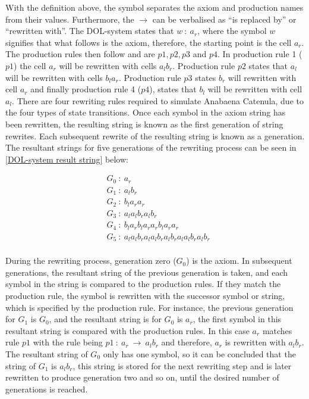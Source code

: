 \noindent
With the definition above, the \say{:} symbol separates the axiom and production names from their values. Furthermore, the $\rightarrow$ can be verbalised as ``is replaced by'' or ``rewritten with''. The DOL-system states that $w~ :~ a_r$, where the symbol $w$ signifies that what follows is the axiom, therefore, the starting point is the cell $a_r$. The production rules then follow and are $p1, p2, p3$ and $p4$. In production rule 1 ($p1$) the cell $a_r$ will be rewritten with cells $a_l b_r$. Production rule $p2$ states that $a_l$ will be rewritten with cells $b_l a_r$. Production rule $p3$ states $b_r$ will rewritten with cell $a_r$ and finally production rule 4 ($p4$), states that $b_l$ will be rewritten with cell $a_l$. There are four rewriting rules required to simulate Anabaena Catenula, due to the four types of state transitions. Once each symbol in the axiom string has been rewritten, the resulting string is known as the first generation of string rewrites. Each subsequent rewrite of the resulting string is known as a generation. The resultant strings for five generations of the rewriting process can be seen in \ref{DOL-system result string} below:

\begin{equation} \label{DOL-system result string}
\begin{aligned}
	& G_0~ :~ a_r \\
	& G_1~ :~ a_l b_r \\
	& G_2~ :~ b_l a_r a_r \\
	& G_3~ :~ a_l a_l b_r a_l b_r \\
	& G_4~ :~ b_l a_r b_l a_r a_r b_l a_r a_r \\
	& G_5~ :~ a_l a_l b_r a_l a_l b_r a_l b_r a_l a_l b_r a_l b_r \\
\end{aligned}
\end{equation}

\noindent
During the rewriting process, generation zero ($G_0$) is the axiom. In subsequent generations, the resultant string of the previous generation is taken, and each symbol in the string is compared to the production rules. If they match the production rule, the symbol is rewritten with the successor symbol or string, which is specified by the production rule. For instance, the previous generation for $G_1$ is $G_0$, and the resultant string is for $G_0$ is $a_r$, the first symbol in this resultant string is compared with the production rules. In this case $a_r$ matches rule $p1$ with the rule being $p1~ :~ a_r~ \rightarrow~ a_l b_r$ and therefore, $a_r$ is rewritten with $a_l b_r$. The resultant string of $G_0$ only has one symbol, so it can be concluded that the string of $G_1$ is $a_l b_r$, this string is stored for the next rewriting step and is later rewritten to produce generation two and so on, until the desired number of generations is reached.


